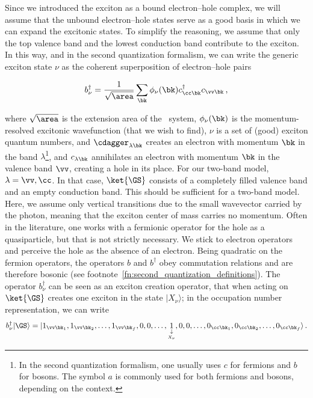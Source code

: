 Since we introduced the exciton as a bound electron--hole complex, we will assume that the unbound electron--hole states serve as a good basis in which we can expand the excitonic states.
To simplify the reasoning, we assume that only the top valence band and the lowest conduction band contribute to the exciton.
In this way, and in the second quantization formalism, we can write the generic exciton state $\nu$ as the coherent superposition of electron--hole pairs

\begin{equation}
    \label{eq:bosonic_exciton_operator}
    b_\nu^{\dagger}=\frac{1}{\sqrt{\area}} \sum_{\bk} \phi_{\nu}(\bk) c^{\dagger}_{\cc  \bk} c_{\vv \bk}\,,
\end{equation}

\noindent where $\sqrt{\area}$ is the extension area of the \bd~system, $\phi_{\nu}(\bk)$ is the momentum-resolved excitonic wavefunction (that we wish to find), $\nu$ is a set of (good) exciton quantum numbers, and $\cdagger_{\lambda \bk}$ creates an electron with momentum $\bk$ in the band $\lambda$\footnote{In the second quantization formalism, one usually uses $c$ for fermions and $b$ for bosons. The symbol $a$ is commonly used for both fermions and bosons, depending on the context.}, and $c_{\lambda \bk}$ annihilates an electron with momentum $\bk$ in the valence band $\vv $, creating a hole in its place.
For our two-band model, $\lambda = \vv,\cc $.
In that case, $\ket{\GS}$ consists of a completely filled valence band and an empty conduction band.
This should be sufficient for a two-band model.
Here, we assume only vertical transitions due to the small wavevector carried by the photon, meaning that the exciton center of mass carries no momentum.
Often in the literature, one works with a fermionic operator for the hole as a quasiparticle, but that is not strictly necessary.
We stick to electron operators and perceive the hole as the absence of an electron.
Being quadratic on the fermion operators, the operators $b$ and $b^{\dagger}$ obey commutation relations and are therefore bosonic (see footnote~\ref{fn:second_quantization_definitions}).
The operator $b^{\dagger}_{\nu}$ can be seen as an exciton creation operator, that when acting on $\ket{\GS}$ creates one exciton in the state $| X_\nu \rangle$; in the occupation number representation, we can write
\begin{equation}
    b^{\dagger}_{\nu}|\GS\rangle=|1_{\vv \bk_1},1_{\vv \bk_2},\dots,1_{\vv \bk_f},0,0,\dots,\underset{\underset{X_\nu}{\downarrow}}{1},0,0,\dots,0_{\cc  \bk_1},0_{\cc  \bk_2},\dots,0_{\cc \bk_f}\rangle\,.
\end{equation}

